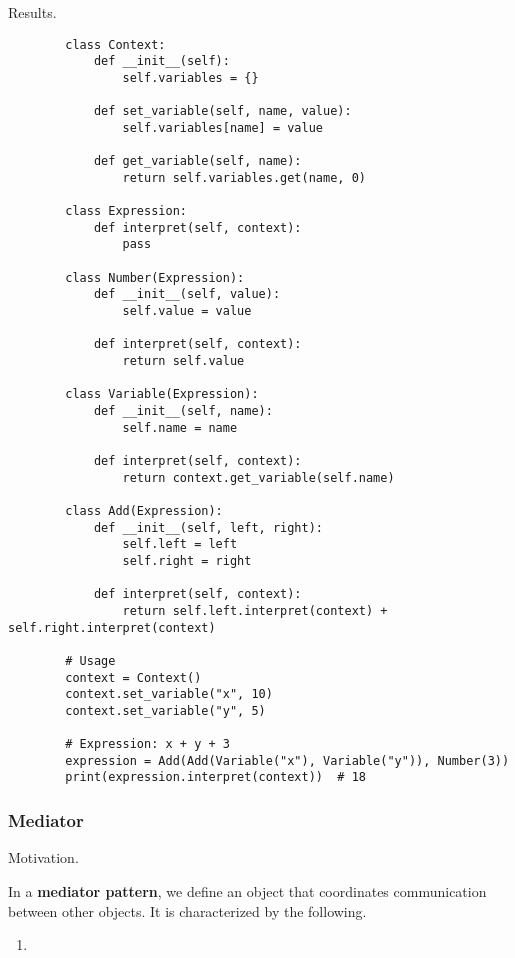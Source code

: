     Results. 

    \begin{example}
      \begin{lstlisting}
        class Context:
            def __init__(self):
                self.variables = {}
            
            def set_variable(self, name, value):
                self.variables[name] = value
            
            def get_variable(self, name):
                return self.variables.get(name, 0)

        class Expression:
            def interpret(self, context):
                pass

        class Number(Expression):
            def __init__(self, value):
                self.value = value
            
            def interpret(self, context):
                return self.value

        class Variable(Expression):
            def __init__(self, name):
                self.name = name
            
            def interpret(self, context):
                return context.get_variable(self.name)

        class Add(Expression):
            def __init__(self, left, right):
                self.left = left
                self.right = right
            
            def interpret(self, context):
                return self.left.interpret(context) + self.right.interpret(context)

        # Usage
        context = Context()
        context.set_variable("x", 10)
        context.set_variable("y", 5)

        # Expression: x + y + 3
        expression = Add(Add(Variable("x"), Variable("y")), Number(3))
        print(expression.interpret(context))  # 18 
      \end{lstlisting}
    \end{example}

  \subsubsection{Mediator}

    Motivation. 

    \begin{definition}
      In a \textbf{mediator pattern}, we define an object that coordinates communication between other objects. It is characterized by the following. 
      \begin{enumerate}
        \item 
      \end{enumerate}
    \end{definition}

